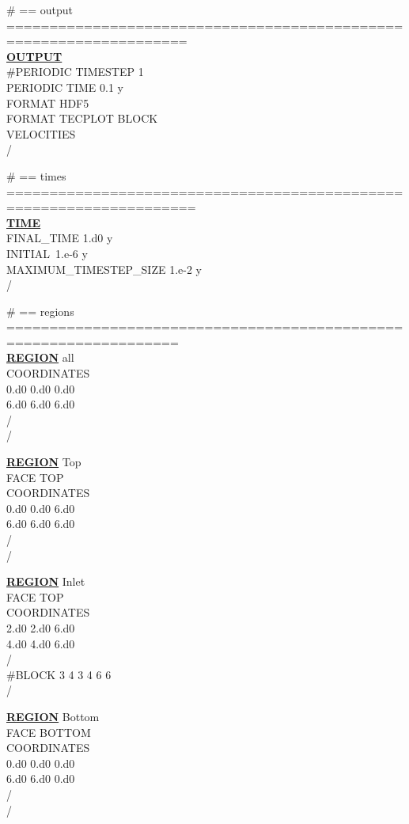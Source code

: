\noindent
\# == output ===================================================================\\
\hyperlink{target_output}{\bf OUTPUT}\\
\#PERIODIC TIMESTEP 1\\
PERIODIC TIME 0.1 y\\
FORMAT HDF5\\
FORMAT TECPLOT BLOCK\\
VELOCITIES\\
/

\noindent
\# == times ====================================================================\\
\hyperlink{target_time}{\bf TIME}\\
FINAL\_TIME 1.d0 y\\
INITIAL\ 1.e-6 y\\
MAXIMUM\_TIMESTEP\_SIZE 1.e-2 y\\
/

\noindent
\# == regions ==================================================================\\
\hyperlink{target_region}{\bf REGION} all\\
COORDINATES\\
0.d0 0.d0 0.d0\\
6.d0 6.d0 6.d0\\
/\\
/

\noindent
\hyperlink{target_region}{\bf REGION} Top\\
FACE TOP\\
COORDINATES\\
0.d0 0.d0 6.d0\\
6.d0 6.d0 6.d0\\
/\\
/

\noindent
\hyperlink{target_region}{\bf REGION} Inlet\\
FACE TOP\\
COORDINATES\\
2.d0 2.d0 6.d0\\
4.d0 4.d0 6.d0\\
/\\
\#BLOCK 3 4 3 4 6 6\\
/

\noindent
\hyperlink{target_region}{\bf REGION} Bottom\\
FACE BOTTOM\\
COORDINATES\\
0.d0 0.d0 0.d0\\
6.d0 6.d0 0.d0\\
/\\
/

